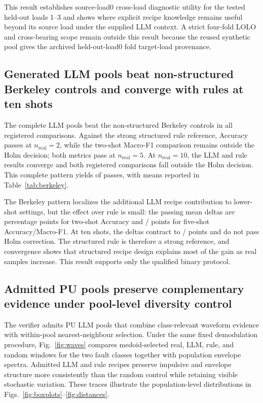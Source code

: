 \documentclass[a4paper,fleqn]{cas-sc}
\begin{document}


This result establishes source-load0 cross-load diagnostic utility for the
tested held-out loads 1--3 and shows where explicit recipe knowledge remains
useful beyond its source load under the supplied LLM context. A strict
four-fold LOLO and cross-bearing scope
remain outside this result because the reused synthetic pool gives the archived
held-out-load0 fold target-load provenance.

\subsection{Generated LLM pools beat non-structured Berkeley controls and
converge with rules at ten shots}

The complete LLM pools beat the non-structured Berkeley controls in all
\BreezeBerkeleyUnstructuredPassedTests{} registered comparisons. Against the
strong structured rule reference, Accuracy passes at
$n_{\mathrm{real}}=2$, while the two-shot Macro-F1 comparison remains outside
the Holm decision; both metrics pass at $n_{\mathrm{real}}=5$. At
$n_{\mathrm{real}}=10$, the LLM and rule results converge and both registered
comparisons fall outside the Holm decision. This complete pattern yields
\BreezeBerkeleyPassedTests{} of \BreezeBerkeleyRegisteredTests{} passes, with
means reported in Table~\ref{tab:berkeley}.



The Berkeley pattern localizes the additional LLM recipe contribution to
lower-shot settings, but the effect over rule is small: the passing mean
deltas are \BreezeBerkeleyNTwoAccRuleDelta{} percentage points for two-shot
Accuracy and \BreezeBerkeleyNFiveAccRuleDelta{}/%
\BreezeBerkeleyNFiveFOneRuleDelta{} points for five-shot
Accuracy/Macro-F1. At ten shots, the deltas contract to
\BreezeBerkeleyNTenAccRuleDelta{}/\BreezeBerkeleyNTenFOneRuleDelta{} points
and do not pass Holm correction. The structured rule is
therefore a strong reference, and convergence shows that structured recipe
design explains most of the gain as real samples increase. This result
supports only the qualified binary protocol.

\subsection{Admitted PU pools preserve complementary evidence under pool-level
diversity control}

The verifier admits PU LLM pools that combine class-relevant waveform evidence
with within-pool nearest-neighbour selection. Under the same fixed
demodulation procedure, Fig.~\ref{fig:waves} compares medoid-selected real,
LLM, rule, and random windows for the two fault classes together with
population envelope spectra. Admitted LLM and rule recipes preserve impulsive and envelope
structure more consistently than the random control while retaining visible
stochastic variation. These traces illustrate the population-level
distributions in Figs.~\ref{fig:boxplots}--\ref{fig:distances}.
\end{document}
